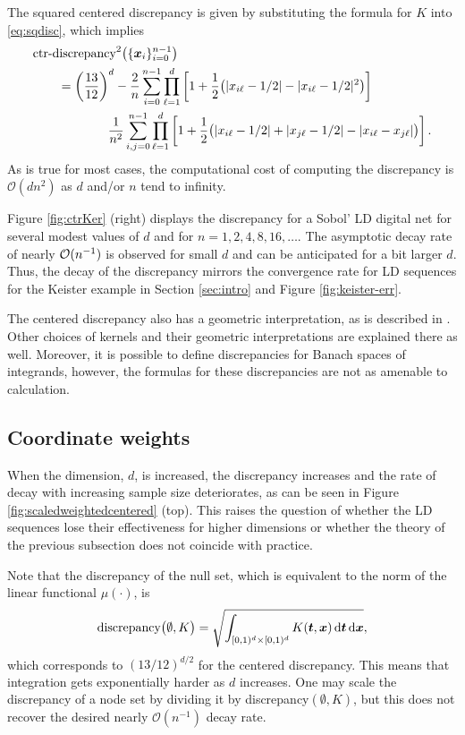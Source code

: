 \documentclass{svproc}
\begin{document}
The squared centered discrepancy is given by substituting the formula for $K$ into \eqref{eq:sqdisc}, which implies
\begin{align} \label{eq:ctrdisc}
	\nonumber
	\MoveEqLeft\text{ctr-discrepancy}^2\bigl(\{ \bsx_i\}_{i=0}^{n-1} \bigr) \\
	\nonumber
	&= \left ( \frac{13}{12} \right )^d
	- \frac 2n \sum_{i=0}^{n-1} \prod_{\ell=1}^d \left [ 1 + \frac 12 \bigl ( \lvert x_{i\ell} - 1/2 \rvert - \lvert x_{i\ell} - 1/2 \rvert^2 \bigr )\right ] \\
	& \qquad \qquad \frac{1}{n^2} \sum_{i,j=0}^{n-1} \prod_{\ell = 1}^d \left[ 1 + \frac 12 \bigl ( \lvert x_{i\ell} - 1/2 \rvert + \lvert x_{j\ell} - 1/2 \rvert - \lvert x_{i\ell} - x_{j\ell} \rvert \bigr ) \right].
\end{align}
As is true for most cases, the computational cost of computing the discrepancy is $\mathcal{O}(dn^2)$ as $d$ and/or $n$ tend to infinity.

Figure  \ref{fig:ctrKer} (right)  displays the discrepancy for a Sobol' LD digital net for several modest values of $d$ and for $n =  1, 2, 4, 8, 16, \ldots$.  The asymptotic decay rate of nearly ${\mathcal{O}}(n^{-1})$ is observed for small $d$ and can be anticipated for a bit larger $d$.  Thus, the decay of the discrepancy mirrors the convergence rate for LD sequences for the Keister example in Section \ref{sec:intro} and Figure \ref{fig:keister-err}.


The centered discrepancy also has a geometric interpretation, as is described in \cite{Hic97a}. Other choices of kernels and their geometric interpretations are explained there as well.  Moreover, it is possible to define discrepancies for Banach spaces of integrands, however, the formulas for these discrepancies are not as amenable to calculation.


\subsection{Coordinate weights} \label{sec:coordwts}
When the dimension, $d$, is increased, the discrepancy increases and the rate of decay with increasing sample size deteriorates, as can be seen in Figure \ref{fig:scaledweightedcentered} (top). This raises the question of whether the LD sequences lose their effectiveness for higher dimensions or whether the theory of the previous subsection does not coincide with practice.

Note that the discrepancy of the null set, which is equivalent to the norm of the linear functional $\mu(\cdot)$, is
\begin{equation}
		\text{discrepancy}\bigl(\emptyset,K \bigr)  = \sqrt{\int_{[0,1)^d \times [0,1)^d} K({\boldsymbol{t}},{\boldsymbol{x}}) \, \mathrm{d} {\boldsymbol{t}} \, \mathrm{d} {\boldsymbol{x}}},
\end{equation}
which corresponds to $(13/12)^{d/2}$ for the centered discrepancy.  This means that integration gets exponentially harder as $d$ increases.  One may scale the discrepancy of a node set by dividing it by discrepancy$(\emptyset,K)$, but this does not recover the desired nearly $\mathcal{O}(n^{-1})$ decay rate.
\end{document}
